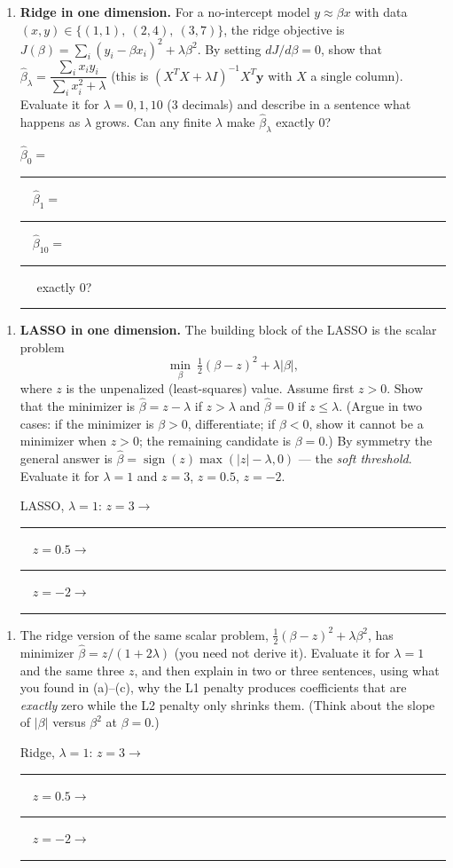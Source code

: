 \documentclass[
  11pt,
]{article}
\newcommand{\answerspace}[1]{\par\vspace*{#1}}  %
\newcommand{\blank}[1][1.2in]{\rule{#1}{0.4pt}}
\begin{document}
\begin{enumerate}
\def\labelenumi{(\alph{enumi})}
\item
  \textbf{Ridge in one dimension.} For a no-intercept model
  \(y \approx \beta x\) with data
  \((x, y) \in \{(1,1),\ (2,4),\ (3,7)\}\), the ridge objective is
  \(J(\beta) = \sum_i (y_i - \beta x_i)^2 + \lambda\beta^2\). By setting
  \(dJ/d\beta = 0\), show that
  \(\hat\beta_\lambda = \dfrac{\sum_i x_iy_i}{\sum_i x_i^2 + \lambda}\)
  (this is \((X^TX + \lambda I)^{-1}X^T\mathbf y\) with \(X\) a single
  column). Evaluate it for \(\lambda = 0, 1, 10\) (3 decimals) and
  describe in a sentence what happens as \(\lambda\) grows. Can any
  finite \(\lambda\) make \(\hat\beta_\lambda\) exactly \(0\)?

  \(\hat\beta_0 =\) \blank[0.8in] \(\quad \hat\beta_1 =\)
  \blank[0.8in] \(\quad \hat\beta_{10} =\) \blank[0.8in] \(\quad\)
  exactly \(0\)? \blank[0.6in]
\end{enumerate}

\answerspace{2.5in}
\newpage

\begin{enumerate}
\def\labelenumi{(\alph{enumi})}
\setcounter{enumi}{1}
\item
  \textbf{LASSO in one dimension.} The building block of the LASSO is
  the scalar problem
  \[\min_\beta\ \tfrac12(\beta - z)^2 + \lambda|\beta|,\] where \(z\) is
  the unpenalized (least-squares) value. Assume first \(z > 0\). Show
  that the minimizer is \(\hat\beta = z - \lambda\) if \(z > \lambda\)
  and \(\hat\beta = 0\) if \(z \le \lambda\). (Argue in two cases: if
  the minimizer is \(\beta > 0\), differentiate; if \(\beta<0\), show it
  cannot be a minimizer when \(z>0\); the remaining candidate is
  \(\beta = 0\).) By symmetry the general answer is
  \(\hat\beta = \operatorname{sign}(z)\max(|z|-\lambda, 0)\) --- the
  \emph{soft threshold}. Evaluate it for \(\lambda = 1\) and \(z = 3\),
  \(z = 0.5\), \(z = -2\).

  LASSO, \(\lambda=1\): \(z=3 \to\) \blank[0.8in] \(\quad z=0.5 \to\)
  \blank[0.8in] \(\quad z=-2 \to\) \blank[0.8in]
\end{enumerate}

\answerspace{3in}

\begin{enumerate}
\def\labelenumi{(\alph{enumi})}
\setcounter{enumi}{2}
\item
  The ridge version of the same scalar problem,
  \(\tfrac12(\beta - z)^2 + \lambda\beta^2\), has minimizer
  \(\hat\beta = z/(1+2\lambda)\) (you need not derive it). Evaluate it
  for \(\lambda = 1\) and the same three \(z\), and then explain in two
  or three sentences, using what you found in (a)--(c), why the L1
  penalty produces coefficients that are \emph{exactly} zero while the
  L2 penalty only shrinks them. (Think about the slope of \(|\beta|\)
  versus \(\beta^2\) at \(\beta = 0\).)

  Ridge, \(\lambda=1\): \(z=3 \to\) \blank[0.8in] \(\quad z=0.5 \to\)
  \blank[0.8in] \(\quad z=-2 \to\) \blank[0.8in]
\end{enumerate}
\end{document}
